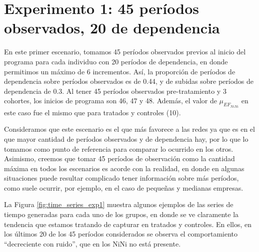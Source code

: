 \documentclass[../../main.tex]{subfiles}
\begin{document}
\section{Experimento 1: 45 períodos observados, 20 de dependencia} \label{sec:exp1}
En este primer escenario, tomamos 45 períodos observados previos al inicio del programa
para cada individuo con 20 períodos de dependencia, en donde permitimos un máximo de 6
incrementos. Así, la proporción de períodos de dependencia sobre períodos observados es de
0.44, y de subidas sobre períodos de dependencia de 0.3. Al tener 45 períodos observados
pre-tratamiento y 3 cohortes, los inicios de programa son 46, 47 y 48. Además, el valor
de \(\mu_{{EF}_{NiNi}}\) en este caso fue el mismo que para tratados y controles (10).

Consideramos que este escenario es el que más favorece a las redes ya que es en el que
mayor cantidad de períodos observados y de dependencia hay, por lo que lo tomamos como
punto de referencia para comparar lo ocurrido en los otros. Asimismo, creemos que tomar 45
períodos de observación como la cantidad máxima en todos los escenarios es acorde con la
realidad, en donde en algunas situaciones puede resultar complicado tener información
sobre más períodos, como suele ocurrir, por ejemplo, en el caso de pequeñas y medianas
empresas.

La Figura \ref{fig:time_series_exp1} muestra algunos ejemplos de las series de tiempo
generadas para cada uno de los grupos, en donde se ve claramente la tendencia que estamos
tratando de capturar en tratados y controles. En ellos, en los últimos 20 de los 45
períodos considerados se observa el comportamiento ``decreciente con ruido'', que en los
NiNi no está presente.
\end{document}
